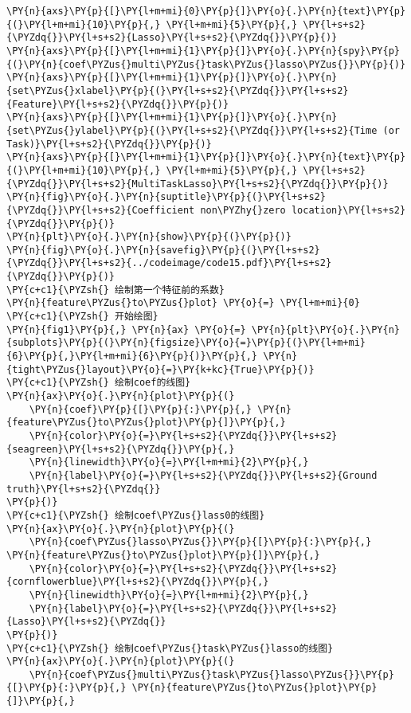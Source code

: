\begin{Verbatim}[commandchars=\\\{\}]
\PY{n}{axs}\PY{p}{[}\PY{l+m+mi}{0}\PY{p}{]}\PY{o}{.}\PY{n}{text}\PY{p}{(}\PY{l+m+mi}{10}\PY{p}{,} \PY{l+m+mi}{5}\PY{p}{,} \PY{l+s+s2}{\PYZdq{}}\PY{l+s+s2}{Lasso}\PY{l+s+s2}{\PYZdq{}}\PY{p}{)}
\PY{n}{axs}\PY{p}{[}\PY{l+m+mi}{1}\PY{p}{]}\PY{o}{.}\PY{n}{spy}\PY{p}{(}\PY{n}{coef\PYZus{}multi\PYZus{}task\PYZus{}lasso\PYZus{}}\PY{p}{)}
\PY{n}{axs}\PY{p}{[}\PY{l+m+mi}{1}\PY{p}{]}\PY{o}{.}\PY{n}{set\PYZus{}xlabel}\PY{p}{(}\PY{l+s+s2}{\PYZdq{}}\PY{l+s+s2}{Feature}\PY{l+s+s2}{\PYZdq{}}\PY{p}{)}
\PY{n}{axs}\PY{p}{[}\PY{l+m+mi}{1}\PY{p}{]}\PY{o}{.}\PY{n}{set\PYZus{}ylabel}\PY{p}{(}\PY{l+s+s2}{\PYZdq{}}\PY{l+s+s2}{Time (or Task)}\PY{l+s+s2}{\PYZdq{}}\PY{p}{)}
\PY{n}{axs}\PY{p}{[}\PY{l+m+mi}{1}\PY{p}{]}\PY{o}{.}\PY{n}{text}\PY{p}{(}\PY{l+m+mi}{10}\PY{p}{,} \PY{l+m+mi}{5}\PY{p}{,} \PY{l+s+s2}{\PYZdq{}}\PY{l+s+s2}{MultiTaskLasso}\PY{l+s+s2}{\PYZdq{}}\PY{p}{)}
\PY{n}{fig}\PY{o}{.}\PY{n}{suptitle}\PY{p}{(}\PY{l+s+s2}{\PYZdq{}}\PY{l+s+s2}{Coefficient non\PYZhy{}zero location}\PY{l+s+s2}{\PYZdq{}}\PY{p}{)}
\PY{n}{plt}\PY{o}{.}\PY{n}{show}\PY{p}{(}\PY{p}{)}
\PY{n}{fig}\PY{o}{.}\PY{n}{savefig}\PY{p}{(}\PY{l+s+s2}{\PYZdq{}}\PY{l+s+s2}{../codeimage/code15.pdf}\PY{l+s+s2}{\PYZdq{}}\PY{p}{)}
\PY{c+c1}{\PYZsh{} 绘制第一个特征前的系数}
\PY{n}{feature\PYZus{}to\PYZus{}plot} \PY{o}{=} \PY{l+m+mi}{0}
\PY{c+c1}{\PYZsh{} 开始绘图}
\PY{n}{fig1}\PY{p}{,} \PY{n}{ax} \PY{o}{=} \PY{n}{plt}\PY{o}{.}\PY{n}{subplots}\PY{p}{(}\PY{n}{figsize}\PY{o}{=}\PY{p}{(}\PY{l+m+mi}{6}\PY{p}{,}\PY{l+m+mi}{6}\PY{p}{)}\PY{p}{,} \PY{n}{tight\PYZus{}layout}\PY{o}{=}\PY{k+kc}{True}\PY{p}{)}
\PY{c+c1}{\PYZsh{} 绘制coef的线图}
\PY{n}{ax}\PY{o}{.}\PY{n}{plot}\PY{p}{(}
    \PY{n}{coef}\PY{p}{[}\PY{p}{:}\PY{p}{,} \PY{n}{feature\PYZus{}to\PYZus{}plot}\PY{p}{]}\PY{p}{,} 
    \PY{n}{color}\PY{o}{=}\PY{l+s+s2}{\PYZdq{}}\PY{l+s+s2}{seagreen}\PY{l+s+s2}{\PYZdq{}}\PY{p}{,} 
    \PY{n}{linewidth}\PY{o}{=}\PY{l+m+mi}{2}\PY{p}{,} 
    \PY{n}{label}\PY{o}{=}\PY{l+s+s2}{\PYZdq{}}\PY{l+s+s2}{Ground truth}\PY{l+s+s2}{\PYZdq{}}
\PY{p}{)}
\PY{c+c1}{\PYZsh{} 绘制coef\PYZus{}lass0的线图}
\PY{n}{ax}\PY{o}{.}\PY{n}{plot}\PY{p}{(}
    \PY{n}{coef\PYZus{}lasso\PYZus{}}\PY{p}{[}\PY{p}{:}\PY{p}{,} \PY{n}{feature\PYZus{}to\PYZus{}plot}\PY{p}{]}\PY{p}{,} 
    \PY{n}{color}\PY{o}{=}\PY{l+s+s2}{\PYZdq{}}\PY{l+s+s2}{cornflowerblue}\PY{l+s+s2}{\PYZdq{}}\PY{p}{,} 
    \PY{n}{linewidth}\PY{o}{=}\PY{l+m+mi}{2}\PY{p}{,} 
    \PY{n}{label}\PY{o}{=}\PY{l+s+s2}{\PYZdq{}}\PY{l+s+s2}{Lasso}\PY{l+s+s2}{\PYZdq{}}
\PY{p}{)}
\PY{c+c1}{\PYZsh{} 绘制coef\PYZus{}task\PYZus{}lasso的线图}
\PY{n}{ax}\PY{o}{.}\PY{n}{plot}\PY{p}{(}
    \PY{n}{coef\PYZus{}multi\PYZus{}task\PYZus{}lasso\PYZus{}}\PY{p}{[}\PY{p}{:}\PY{p}{,} \PY{n}{feature\PYZus{}to\PYZus{}plot}\PY{p}{]}\PY{p}{,}

\end{Verbatim}

